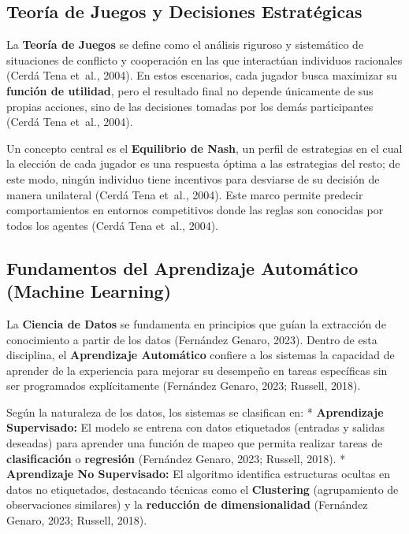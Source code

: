 \documentclass[
  spanish,
  12pt,
]{report}
\begin{document}
\subsection{Teoría de Juegos y Decisiones
Estratégicas}\label{teoruxeda-de-juegos-y-decisiones-estratuxe9gicas}

La \textbf{Teoría de Juegos} se define como el análisis riguroso y
sistemático de situaciones de conflicto y cooperación en las que
interactúan individuos racionales (Cerdá Tena et~al., 2004). En estos
escenarios, cada jugador busca maximizar su \textbf{función de
utilidad}, pero el resultado final no depende únicamente de sus propias
acciones, sino de las decisiones tomadas por los demás participantes
(Cerdá Tena et~al., 2004).

Un concepto central es el \textbf{Equilibrio de Nash}, un perfil de
estrategias en el cual la elección de cada jugador es una respuesta
óptima a las estrategias del resto; de este modo, ningún individuo tiene
incentivos para desviarse de su decisión de manera unilateral (Cerdá
Tena et~al., 2004). Este marco permite predecir comportamientos en
entornos competitivos donde las reglas son conocidas por todos los
agentes (Cerdá Tena et~al., 2004).

\subsection{Fundamentos del Aprendizaje Automático (Machine
Learning)}\label{fundamentos-del-aprendizaje-automuxe1tico-machine-learning}

La \textbf{Ciencia de Datos} se fundamenta en principios que guían la
extracción de conocimiento a partir de los datos (Fernández Genaro,
2023). Dentro de esta disciplina, el \textbf{Aprendizaje Automático}
confiere a los sistemas la capacidad de aprender de la experiencia para
mejorar su desempeño en tareas específicas sin ser programados
explícitamente (Fernández Genaro, 2023; Russell, 2018).

Según la naturaleza de los datos, los sistemas se clasifican en: *
\textbf{Aprendizaje Supervisado:} El modelo se entrena con datos
etiquetados (entradas y salidas deseadas) para aprender una función de
mapeo que permita realizar tareas de \textbf{clasificación} o
\textbf{regresión} (Fernández Genaro, 2023; Russell, 2018). *
\textbf{Aprendizaje No Supervisado:} El algoritmo identifica estructuras
ocultas en datos no etiquetados, destacando técnicas como el
\textbf{Clustering} (agrupamiento de observaciones similares) y la
\textbf{reducción de dimensionalidad} (Fernández Genaro, 2023; Russell,
2018).
\end{document}
